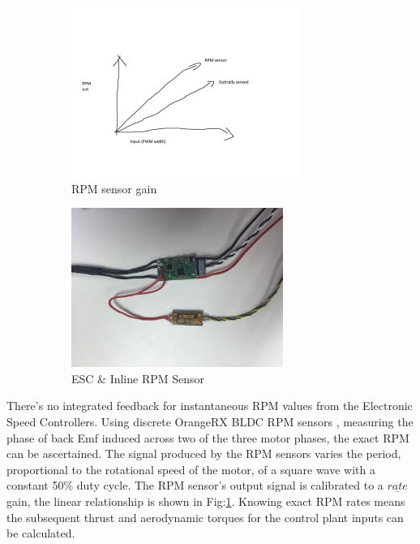 \begin{figure}[htbp]
\begin{subfigure}{0.5\textwidth}
\centering
\includegraphics[width=\textwidth]{figs/rpm-sensor-plot}
\caption{RPM sensor gain}
\label{fig:rpm-sensor-plot}
\end{subfigure}
\begin{subfigure}{0.5\textwidth}
\centering
\includegraphics[width=\textwidth]{figs/motor-esc}
\caption{ESC \& Inline RPM Sensor}
\label{fig:st-link}
\end{subfigure}
\caption{}
\end{figure}
\par
There's no integrated feedback for instantaneous RPM values from the Electronic Speed Controllers. Using discrete OrangeRX BLDC RPM sensors \cite{orangerpm}, measuring the phase of back Emf induced across two of the three motor phases, the exact RPM can be ascertained. The signal produced by the RPM sensors varies the period, proportional to the rotational speed of the motor, of a square wave with a constant 50\% duty cycle. The RPM sensor's output signal is calibrated to a $\underline{rate}$ gain, the linear relationship is shown in Fig:\ref{fig:rpm-sensor-plot}. Knowing exact RPM rates means the subsequent thrust and aerodynamic torques for the control plant inputs can be calculated.
